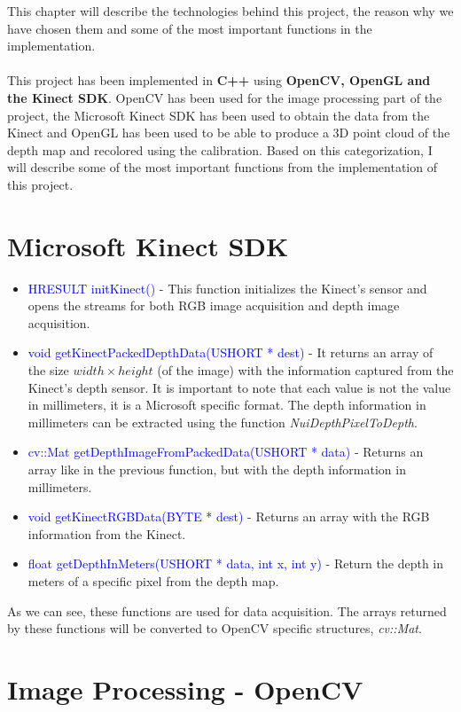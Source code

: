 \noindent
This chapter will describe the technologies behind this project, the reason why we have chosen them and some of the most important functions in the implementation. 
\\\\
This project has been implemented in {\bf C++} using {\bf OpenCV, OpenGL and the Kinect SDK}. OpenCV has been used for the image processing part of the project, the Microsoft Kinect SDK has been used to obtain the data from the Kinect and OpenGL has been used to be able to produce a 3D point cloud of the depth map and recolored using the calibration. Based on this categorization, I will describe some of the most important functions from the implementation of this project. 

\section{Microsoft Kinect SDK}
\begin{itemize}
	\item \textcolor{blue}{HRESULT initKinect()} - This function initializes the Kinect's sensor and opens the streams for both RGB image acquisition and depth image acquisition. 
	\item \textcolor{blue}{void getKinectPackedDepthData(USHORT * dest)} - It returns an array of the size $width \times height$ (of the image) with the information captured from the Kinect's depth sensor. It is important to note that each value is not the value in millimeters, it is a Microsoft specific format. The depth information in millimeters can be extracted using the function \emph{NuiDepthPixelToDepth}.
	\item \textcolor{blue}{cv::Mat getDepthImageFromPackedData(USHORT * data)} - Returns an array like in the previous function, but with the depth information in millimeters. 
	\item \textcolor{blue}{void getKinectRGBData(BYTE * dest)}  - Returns an array with the RGB information from the Kinect. 
	\item \textcolor{blue}{float getDepthInMeters(USHORT * data, int x, int y)} - Return the depth in meters of a specific pixel from the depth map. 
\end{itemize} 

\noindent
As we can see, these functions are used for data acquisition. The arrays returned by these functions will be converted to OpenCV specific structures, \emph{cv::Mat}. 

\section{Image Processing - OpenCV}

